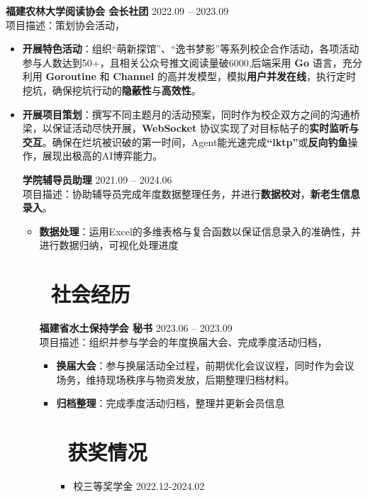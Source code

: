 \documentclass[11pt]{article}
\newlength{\interProjectSpacing}
\newcommand{\projectsep}{\vspace{\interProjectSpacing}}
\newlength{\intraProjectTitleSep}
\newcommand{\titlebreak}{\\[\intraProjectTitleSep]}
\newlength{\intraProjectListTopSep}
\begin{document}
\textbf{福建农林大学阅读协会 会长社团} \hfill 2022.09 -- 2023.09 \titlebreak
项目描述：策划协会活动，
\begin{itemize}[nosep, topsep=\intraProjectListTopSep]
    \item \textbf{开展特色活动}：组织“萌新探馆”、“逸书梦影”等系列校企合作活动，各项活动参与人数达到50+，且相关公众号推文阅读量破6000,后端采用 \textbf{Go} 语言，充分利用 \textbf{Goroutine} 和 \textbf{Channel} 的高并发模型，模拟\textbf{用户并发在线}，执行定时挖坑，确保挖坑行动的\textbf{隐蔽性}与\textbf{高效性}。
    \item \textbf{开展项目策划}：撰写不同主题月的活动预案，同时作为校企双方之间的沟通桥梁，以保证活动尽快开展，\textbf{WebSocket} 协议实现了对目标帖子的\textbf{实时监听与交互}。确保在烂坑被识破的第一时间，Agent能光速完成\textbf{“lktp”}或\textbf{反向钓鱼}操作，展现出极高的AI博弈能力。
\projectsep

\textbf{学院辅导员助理} \hfill 2021.09 -- 2024.06 \titlebreak
项目描述：协助辅导员完成年度数据整理任务，并进行\textbf{数据校对}，\textbf{新老生信息录入}。
\begin{itemize}[nosep, topsep=\intraProjectListTopSep]
    \item \textbf{数据处理}：运用Excel的多维表格与复合函数以保证信息录入的准确性，并进行数据归纳，可视化处理进度 
    
\projectsep

\section{\makebox[\widthof{\faUsers}][c]{\color{CVBlue}\faUsers}\ 社会经历}
\textbf{福建省水土保持学会 秘书} \hfill 2023.06 -- 2023.09 \titlebreak
项目描述：组织并参与学会的年度换届大会、完成季度活动归档，
\begin{itemize}[nosep, topsep=\intraProjectListTopSep]
    \item \textbf{换届大会}：参与换届活动全过程，前期优化会议议程，同时作为会议场务，维持现场秩序与物资发放，后期整理归档材料。
    \item \textbf{归档整理}：完成季度活动归档，整理并更新会员信息
    


\section{\makebox[\widthof{\faGraduationCap}][c]{\color{CVBlue}\faList}\ 获奖情况}
\begin{itemize}
    \item 校三等奖学金 \hfill 2022.12-2024.02
    

\end{itemize}
\end{itemize}
\end{itemize}
\end{itemize}
\end{document}
